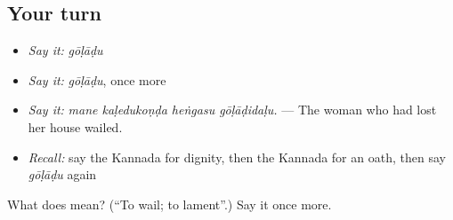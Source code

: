 \subsection*{Your turn}
\begin{itemize}
\raggedright
  \item \emph{Say it:} \emph{gōḷāḍu}
  \item \emph{Say it:} \emph{gōḷāḍu}, once more
  \item \emph{Say it:} \emph{mane kaḷedukoṇḍa heṅgasu gōḷāḍidaḷu.} — The woman who had lost her house wailed.
  \item \emph{Recall:} say the Kannada for dignity, then the Kannada for an oath, then say \emph{gōḷāḍu} again
\end{itemize}

\begin{tcolorbox}[breakable,colback=teal!4,colframe=teal!35!black,title={Before you move on}]
What does  mean? (\textquotedblleft{}To wail; to lament\textquotedblright{}.) Say it once more.
\end{tcolorbox}
